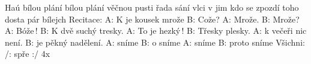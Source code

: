 \begin{TEXT}{Haú bílou plání}
\REFREN  {} bílou plání věčnou pusti \NL
{} řada sání vlci v  jim   \NL
{} kdo se zpozdí toho dosta \NL
{} pár bílejch    
\SLOKA[] Recitace: \NL
A: K  je kousek mrože \NL
B: Cože? \NL
A: Mrože. \NL
B: Mrože? \NL
A: Bóže\,! \NL
B: K  dvě suchý tresky. \NL
A: To je hezký\,! \NL
B: Třesky plesky. \NL
A:  k večeři nic není. \NL
B:  je pěkný nadělení. \NL
A:  sníme \NL
B: o sníme \NL
A:  sníme \NL
B: proto sníme \NL
Všichni: /:  spře :/           4x \NL
\end{TEXT}
